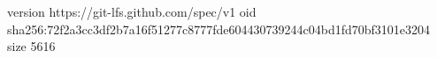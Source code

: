 version https://git-lfs.github.com/spec/v1
oid sha256:72f2a3cc3df2b7a16f51277c8777fde604430739244c04bd1fd70bf3101e3204
size 5616
